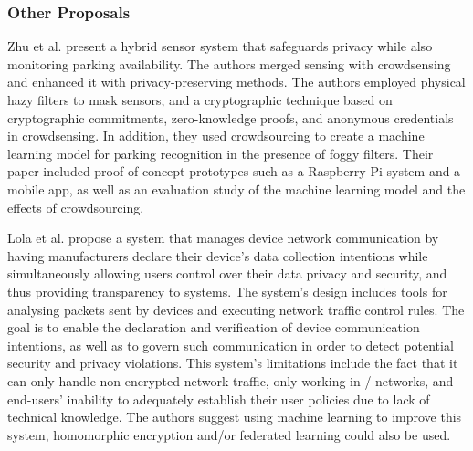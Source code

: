 \subsubsection{Other Proposals}\label{subsubsection:other_proposals}

Zhu et al. \cite{ZhuIntegrating} present a hybrid sensor system that safeguards
privacy while also monitoring parking availability. The authors merged \hyperlink{\acronym}{\acronym}
sensing with crowdsensing and enhanced it with privacy-preserving methods.
The authors employed physical hazy filters to mask \hyperlink{\acronym}{\acronym} sensors,
and a cryptographic technique based on cryptographic commitments, zero-knowledge
proofs, and anonymous credentials in crowdsensing. In addition, they used
crowdsourcing to create a machine learning model for parking recognition
in the presence of foggy filters. Their paper included proof-of-concept
prototypes such as a Raspberry Pi system and a mobile app, as well as an
evaluation study of the machine learning model and the effects of crowdsourcing.

Lola et al. \cite{electronics12122589} propose a system that manages \hyperlink{\acronym}{\acronym}
device network communication by having manufacturers declare their device's
data collection intentions while simultaneously allowing \hyperlink{\acronym}{\acronym} users control
over their data privacy and security, and thus providing transparency to
\hyperlink{\acronym}{\acronym} systems. The system's design includes tools for analysing packets sent
by \hyperlink{\acronym}{\acronym} devices and executing network traffic control rules. The goal is
to enable the declaration and verification of \hyperlink{\acronym}{\acronym} device communication
intentions, as well as to govern such communication in order to detect
potential security and privacy violations. This system's limitations include
the fact that it can only handle non-encrypted network traffic, only working
in \hyperlink{\acronym}{\acronym}/\hyperlink{\acronym}{\acronym} networks, and end-users' inability to adequately establish
their user policies due to lack of technical knowledge. The authors
suggest using machine learning to improve this system, homomorphic encryption
and/or federated learning could also be used.

